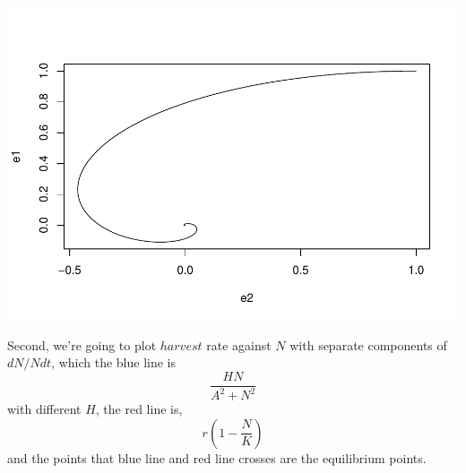 \documentclass[
]{book}
\begin{document}
\includegraphics{bookdown-demo_files/figure-latex/unnamed-chunk-28-1.pdf}

Second, we're going to plot \(harvest\) rate against \(N\) with
separate components of \(dN/Ndt\), which the blue line is
\[
\dfrac{HN}{A^2 + N^2}
\]
with different \(H\), the red line is,
\[
r(1 - \dfrac{N}{K})
\]
and the points that blue line and red line crosses are the equilibrium points.
\end{document}
